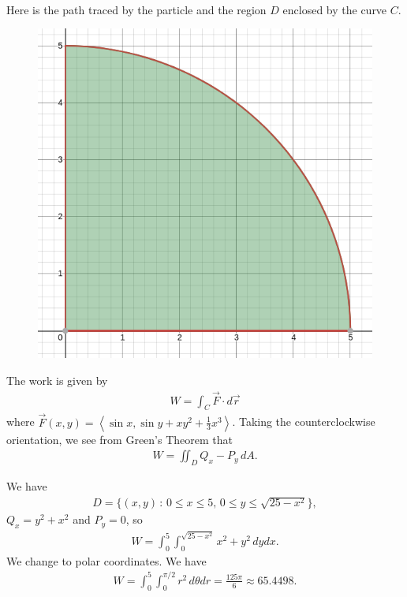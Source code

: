 	\\
	Here is the path traced by the particle and the region $D$ enclosed by the curve $C$.
		\begin{figure}[ht]
		\centering
		\includegraphics[scale=0.3]{picture2.png}
		\end{figure}
	The work is given by
		\begin{align*}
		W = \int_C \vec{F} \cdot d\vec{r} 
		\end{align*}
	where $\vec{F} (x, y) = \left\langle \sin x , \sin y + xy^2 + \frac{1}{3} x^3 \right\rangle$. Taking the counterclockwise orientation, we see from Green's Theorem that
		\begin{align*}
		W = \iint_D Q_x - P_y \, dA .
		\end{align*}
	
	We have
		\begin{align*}
		D = \{ (x, y) \, : \, 0 \leq x \leq 5 , \, 0 \leq y \leq \sqrt{25 - x^2} \},
		\end{align*}
	$Q_x = y^2 + x^2$ and $P_y = 0$, so
		\begin{align*}
		W = \int_0^5 \int_0^{\sqrt{25 - x^2}} x^2 + y^2 \, dy dx .
		\end{align*}
	We change to polar coordinates. We have
		\begin{align*}
		W = \int_0^5 \int_0^{\pi/2} r^2 \, d\theta dr = \frac{125 \pi}{6} \approx 65.4498 .
		\end{align*}


